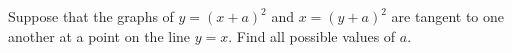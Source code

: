 Suppose that the graphs of $y=(x+a)^2$ and $x=(y+a)^2$ are tangent to one another at a point on the line $y=x$. Find all possible values of $a$.

